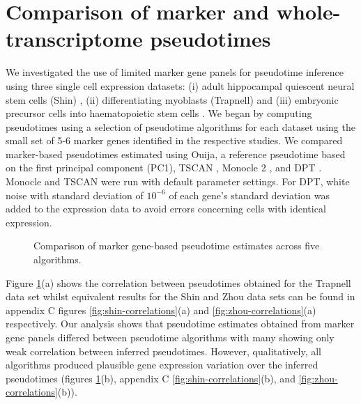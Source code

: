 \section{Comparison of marker and whole-transcriptome pseudotimes}

We investigated the use of limited marker gene panels for pseudotime inference using three single cell expression datasets: (i) adult hippocampal quiescent neural stem cells (Shin) \cite{Shin2015}, (ii) differentiating myoblasts (Trapnell) \cite{Trapnell2014-xi} and (iii) embryonic precursor cells into haematopoietic stem cells \cite{zhou2016tracing}. We began by computing pseudotimes using a selection of pseudotime algorithms for each dataset using the small set of 5-6 marker genes identified in the respective studies. We compared marker-based pseudotimes estimated using Ouija, a reference pseudotime based on the first principal component (PC1), TSCAN  \cite{Ji2016-gx}, Monocle 2 \cite{qiu2017reversed}, and DPT \cite{haghverdi2016diffusion}. Monocle and TSCAN were run with default parameter settings. For DPT, white noise with standard deviation of $10^{-6}$ of each gene’s standard deviation was added to the expression data to avoid errors concerning cells with identical expression.


\begin{figure}%
\centering

	\caption{Comparison of marker gene-based pseudotime estimates across five algorithms.}
	\label{fig:trapnell-correlations}
\end{figure}

Figure \ref{fig:trapnell-correlations}(a) shows the correlation between pseudotimes obtained for the Trapnell data set whilst equivalent results for the Shin and Zhou data sets can be found in appendix C figures \ref{fig:shin-correlations}(a) and \ref{fig:zhou-correlations}(a) respectively. Our analysis shows that pseudotime estimates obtained from marker gene panels differed between pseudotime algorithms with many showing only weak correlation between inferred pseudotimes. However, qualitatively, all algorithms produced plausible gene expression variation over the inferred pseudotimes (figures \ref{fig:trapnell-correlations}(b), appendix C \ref{fig:shin-correlations}(b), and \ref{fig:zhou-correlations}(b)).



